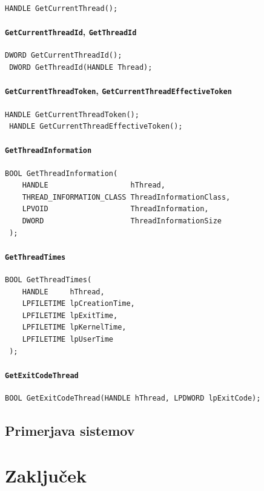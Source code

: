 \documentclass[a4paper,12pt,openright]{book}
\begin{document}
\begin{lstlisting}[style=func]
 HANDLE GetCurrentThread();
\end{lstlisting}

\subsubsection{\texttt{GetCurrentThreadId}, \texttt{GetThreadId}}

\begin{lstlisting}[style=func]
 DWORD GetCurrentThreadId();
 DWORD GetThreadId(HANDLE Thread);
\end{lstlisting}

\subsubsection{\texttt{GetCurrentThreadToken}, \texttt{GetCurrentThreadEffectiveToken}}

\begin{lstlisting}[style=func]
 HANDLE GetCurrentThreadToken();
 HANDLE GetCurrentThreadEffectiveToken();
\end{lstlisting}

\subsubsection{\texttt{GetThreadInformation}}

\begin{lstlisting}[style=func]
 BOOL GetThreadInformation(
	HANDLE                   hThread,
	THREAD_INFORMATION_CLASS ThreadInformationClass,
	LPVOID                   ThreadInformation,
	DWORD                    ThreadInformationSize
 );
\end{lstlisting}

\subsubsection{\texttt{GetThreadTimes}}

\begin{lstlisting}[style=func]
 BOOL GetThreadTimes(
	HANDLE     hThread,
	LPFILETIME lpCreationTime,
	LPFILETIME lpExitTime,
	LPFILETIME lpKernelTime,
	LPFILETIME lpUserTime
 );
\end{lstlisting}

\subsubsection{\texttt{GetExitCodeThread}}

\begin{lstlisting}[style=func]
 BOOL GetExitCodeThread(HANDLE hThread, LPDWORD lpExitCode);
\end{lstlisting}

\section{Primerjava sistemov}

\chapter{Zaključek}


\printbibliography[heading=bibintoc,title={Literatura}]
\end{document}
